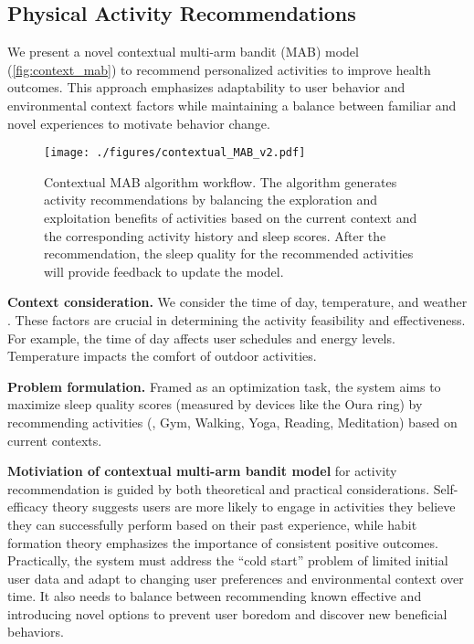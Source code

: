 \subsection{Physical Activity Recommendations}
\label{subsec.act_rec}
We present a novel contextual multi-arm bandit (MAB) model (\autoref{fig:context_mab}) to recommend personalized activities to improve health outcomes.
This approach emphasizes adaptability to user behavior and environmental context factors while maintaining a balance between familiar and novel experiences to motivate behavior change.

\begin{figure*}
  \texttt{[image: ./figures/contextual\_MAB\_v2.pdf]}
  \caption{Contextual MAB algorithm workflow. The algorithm generates activity recommendations by balancing the exploration and exploitation benefits of activities based on the current context and the corresponding activity history and sleep scores. After the recommendation, the sleep quality for the recommended activities will provide feedback to update the model.}
  \label{fig:context_mab}
\end{figure*}


\textbf{Context consideration.}
We consider the time of day, temperature, and weather \cite{hardeman2019systematic, klenk2012walking, herbolsheimer2016physical, giles2002relative}.
These factors are crucial in determining the activity feasibility and effectiveness. 
For example, the time of day affects user schedules and energy levels. 
Temperature impacts the comfort of outdoor activities.

\textbf{Problem formulation.}
Framed as an optimization task, the system aims to maximize sleep quality scores (measured by devices like the Oura ring) by recommending activities (\eg, Gym, Walking, Yoga, Reading, Meditation) based on current contexts.

\textbf{Motiviation of contextual multi-arm bandit model}
for activity recommendation is guided by both theoretical and practical considerations.
Self-efficacy theory \cite{bandura1977self} suggests users are more likely to engage in activities they believe they can successfully perform based on their past experience, while habit formation theory \cite{lally2010habits} emphasizes the importance of consistent positive outcomes.
Practically, the system must address the ``cold start'' problem of limited initial user data and adapt to changing user preferences and environmental context over time.
It also needs to balance between recommending known effective and introducing novel options to prevent user boredom and discover new beneficial behaviors.

